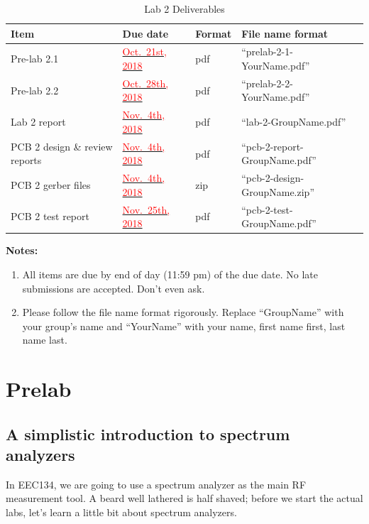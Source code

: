 \documentclass[letterpaper, 11pt]{article}
\newcommand{\due}[1]{\href{https://github.com/ucdart/UCD-EEC134/blob/master/support/schedule/eec134-schedule.pdf}{\textcolor{red}{#1}}}
\begin{document}
\vspace{0.5cm}

\begin{table}[h]
	\footnotesize
	\caption{Lab 2 Deliverables}
	\renewcommand{\arraystretch}{1.2}
	\begin{tabular}{|m{1in}|l|m{0.45in}|m{2in}|}
		\hline
		\textbf{Item} & \textbf{Due date} & \textbf{Format} & \textbf{File name format} \\
		\hline \hline
		Pre-lab 2.1 & \due{Oct.~21st, 2018} & pdf & ``prelab-2-1-YourName.pdf'' \\
		\hline
		Pre-lab 2.2 & \due{Oct.~28th, 2018} & pdf & ``prelab-2-2-YourName.pdf''\\
		\hline
		Lab 2 report & \due{Nov.~4th, 2018} & pdf & ``lab-2-GroupName.pdf''\\
		\hline
		PCB 2 design \& review reports & \due{Nov.~4th, 2018} & pdf & ``pcb-2-report-GroupName.pdf''\\
		\hline
		PCB 2 gerber files & \due{Nov.~4th, 2018} & zip & ``pcb-2-design-GroupName.zip''\\
		\hline
		PCB 2 test report & \due{Nov.~25th, 2018} & pdf & ``pcb-2-test-GroupName.pdf''\\
		\hline
	\end{tabular}
	\label{tab:deliverables}
\end{table}

\textbf{Notes:}
\begin{enumerate}
	\item All items are due by end of day (11:59 pm) of the due date. No late submissions are accepted. Don't even ask. 
	
	\item Please follow the file name format rigorously. Replace ``GroupName'' with your group's name and ``YourName'' with your name, first name first, last name last. 
	
\end{enumerate}
	
\newpage
\section{Prelab}

\subsection{A simplistic introduction to spectrum analyzers}
In EEC134, we are going to use a spectrum analyzer as the main RF measurement tool. A beard well lathered is half shaved; before we start the actual labs, let's learn a little bit about spectrum analyzers.
\end{document}
